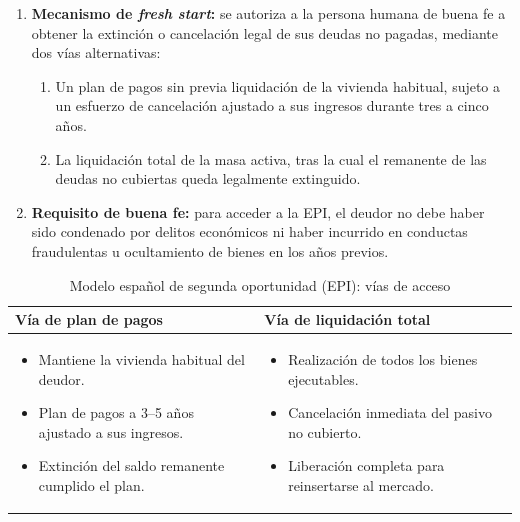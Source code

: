 \documentclass[12pt,oneside]{book}
\begin{document}
\begin{enumerate}
    \item \textbf{Mecanismo de \textit{fresh start}:} se autoriza a la persona humana de buena fe a obtener la extinción o cancelación legal de sus deudas no pagadas, mediante dos vías alternativas:
    \begin{enumerate}[label=(\alph*)]
        \item Un plan de pagos sin previa liquidación de la vivienda habitual, sujeto a un esfuerzo de cancelación ajustado a sus ingresos durante tres a cinco años.
        \item La liquidación total de la masa activa, tras la cual el remanente de las deudas no cubiertas queda legalmente extinguido.
    \end{enumerate}

    \item \textbf{Requisito de buena fe:} para acceder a la EPI, el deudor no debe haber sido condenado por delitos económicos ni haber incurrido en conductas fraudulentas u ocultamiento de bienes en los años previos.
\end{enumerate}

\begin{table}[H]
\centering
\caption{Modelo español de segunda oportunidad (EPI): vías de acceso}
\renewcommand{\arraystretch}{1.2}
\begin{tabularx}{\textwidth}{
    >{\raggedright\arraybackslash}X
    >{\raggedright\arraybackslash}X
}
\toprule
\textbf{Vía de plan de pagos} & \textbf{Vía de liquidación total} \\
\midrule
\begin{itemize}[leftmargin=*,nosep]
    \item Mantiene la vivienda habitual del deudor.
    \item Plan de pagos a 3--5 años ajustado a sus ingresos.
    \item Extinción del saldo remanente cumplido el plan.
\end{itemize}
&
\begin{itemize}[leftmargin=*,nosep]
    \item Realización de todos los bienes ejecutables.
    \item Cancelación inmediata del pasivo no cubierto.
    \item Liberación completa para reinsertarse al mercado.
\end{itemize}
\\
\bottomrule
\end{tabularx}
\end{table}
\end{document}
